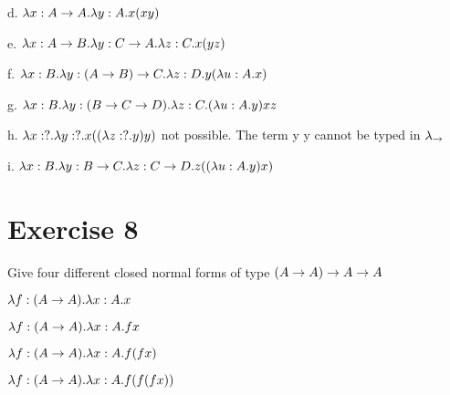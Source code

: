 \documentclass[11pt,a4paper]{article}
\begin{document}
d. $\lambda x:A \rightarrow A. \lambda y:A. x (x y)$

e. $\lambda x:A \rightarrow B. \lambda y:C \rightarrow A. \lambda z:C. x (y z)$

f. $\lambda x:B. \lambda y:(A \rightarrow B) \rightarrow C. \lambda z:D. y (\lambda u:A. x)$

g. $\lambda x :B. \lambda y :(B \rightarrow C \rightarrow D). \lambda z :C. (\lambda u :A. y) x z$

h. $\lambda x :?. \lambda y :?. x ((\lambda z :?. y)y)$ not possible. The term y y cannot be typed in $\lambda_{\rightarrow}$

i. $\lambda x:B. \lambda y:B \rightarrow C. \lambda z:C \rightarrow D. z ((\lambda u:A. y) x)$

\section*{Exercise 8}
Give four different closed normal forms of type $(A \rightarrow A) \rightarrow A \rightarrow A$

$\lambda f : (A \rightarrow A) . \lambda x : A . x $

$\lambda f : (A \rightarrow A) . \lambda x : A . f x$

$\lambda f : (A \rightarrow A) . \lambda x : A . f (f x)$

$\lambda f : (A \rightarrow A) . \lambda x : A . f (f (f x))$
\end{document}
